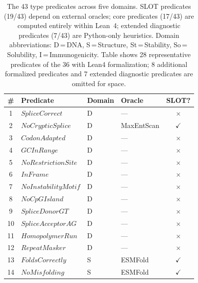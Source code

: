 \documentclass[acmsmall,review,anonymous]{acmart}
\begin{document}
\begin{table}[t]
\centering
\caption{The 43 type predicates across five domains. SLOT predicates
         (19/43) depend on external oracles; core predicates (17/43)
         are computed entirely within Lean~4; extended diagnostic
         predicates (7/43) are Python-only heuristics.
         Domain abbreviations: D\,=\,DNA, S\,=\,Structure,
         St\,=\,Stability, So\,=\,Solubility, I\,=\,Immunogenicity.
         Table shows 28 representative predicates of the 36 with
         Lean4 formalization; 8 additional formalized predicates and
         7 extended diagnostic predicates are omitted for space.}
\label{tab:predicates43}
\begin{tabular}{clllc}
\toprule
\textbf{\#} & \textbf{Predicate} & \textbf{Domain} &
  \textbf{Oracle} & \textbf{SLOT?} \\
\midrule
 1 & $\mathit{SpliceCorrect}$          & D  & ---                   & $\times$ \\
 2 & $\mathit{NoCrypticSplice}$        & D  & MaxEntScan            & $\checkmark$ \\
 3 & $\mathit{CodonAdapted}$           & D  & ---                   & $\times$ \\
 4 & $\mathit{GCInRange}$              & D  & ---                   & $\times$ \\
 5 & $\mathit{NoRestrictionSite}$      & D  & ---                   & $\times$ \\
 6 & $\mathit{InFrame}$                & D  & ---                   & $\times$ \\
 7 & $\mathit{NoInstabilityMotif}$     & D  & ---                   & $\times$ \\
 8 & $\mathit{NoCpGIsland}$            & D  & ---                   & $\times$ \\
 9 & $\mathit{SpliceDonorGT}$          & D  & ---                   & $\times$ \\
10 & $\mathit{SpliceAcceptorAG}$       & D  & ---                   & $\times$ \\
11 & $\mathit{HomopolymerRun}$         & D  & ---                   & $\times$ \\
12 & $\mathit{RepeatMasker}$           & D  & ---                   & $\times$ \\
\midrule
13 & $\mathit{FoldsCorrectly}$         & S  & ESMFold               & $\checkmark$ \\
14 & $\mathit{NoMisfolding}$           & S  & ESMFold               & $\checkmark$ \\

\end{tabular}
\end{table}
\end{document}
